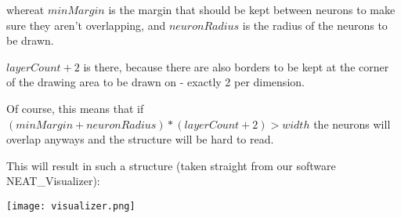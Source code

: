  whereat $ minMargin $ is the margin that should be kept between neurons to make sure they aren't overlapping, and $ neuronRadius $ is the radius of the neurons to be drawn.
 
 $ layerCount + 2 $ is there, because there are also borders to be kept at the corner of the drawing area to be drawn on - exactly 2 per dimension.
 
 Of course, this means that if $ (minMargin + neuronRadius) * (layerCount + 2) > width $ the neurons will overlap anyways and the structure will be hard to read.
 
 This will result in such a structure (taken straight from our software NEAT\_Visualizer):
 
 \texttt{[image: visualizer.png]}